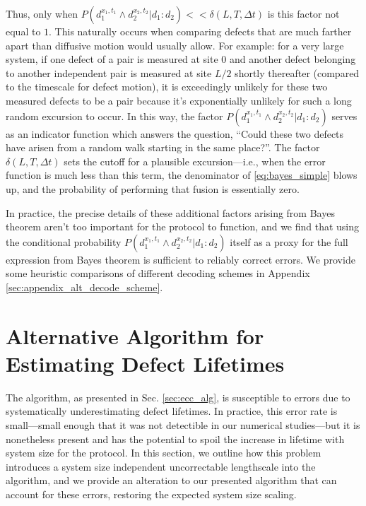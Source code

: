 \documentclass[twocolumn,superscriptaddress,aps,prb,floatfix]{revtex4-1}
\begin{document}
Thus, only when $P(d_1^{x_1,t_1} \wedge d_2^{x_2,t_2} | d_1:d_2) << \delta(L,T,\Delta t)$ is this factor not equal to $1$.  This naturally occurs when comparing defects that are much farther apart than diffusive motion would usually allow.  For example: for a very large system, if one defect of a pair is measured at site $0$ and another defect belonging to another independent pair is measured at site $L/2$ shortly thereafter (compared to the timescale for defect motion), it is exceedingly unlikely for these two measured defects to be a pair because it's exponentially unlikely for such a long random excursion to occur.  In this way, the factor $P(d_1^{x_1,t_1} \wedge d_2^{x_2,t_2} | d_1:d_2)$  serves as an indicator function which answers the question, ``Could these two defects have arisen from a random walk starting in the same place?''.  The factor $\delta(L,T,\Delta t)$ sets the cutoff for a plausible excursion---i.e., when the error function is much less than this term, the denominator of \ref{eq:bayes_simple} blows up, and the probability of performing that fusion is essentially zero.

In practice, the precise details of these additional factors arising from Bayes theorem aren't too important for the protocol to function, and we find that using the conditional probability $P(d_1^{x_1,t_1} \wedge d_2^{x_2,t_2} | d_1:d_2)$ itself as a proxy for the full expression from Bayes theorem is sufficient to reliably correct errors.  We provide some heuristic comparisons of different decoding schemes in Appendix \ref{sec:appendix_alt_decode_scheme}.


\section{Alternative Algorithm for Estimating Defect Lifetimes}
\label{sec:appendix_fix_long_errors}

The algorithm, as presented in Sec. \ref{sec:ecc_alg}, is susceptible to errors due to systematically underestimating defect lifetimes.  In practice, this error rate is small---small enough that it was not detectible in our numerical studies---but it is nonetheless present and has the potential to spoil the increase in lifetime with system size for the protocol.  In this section, we outline how this problem introduces a system size independent uncorrectable lengthscale into the algorithm, and we provide an alteration to our presented algorithm that can account for these errors, restoring the expected system size scaling.
\end{document}
